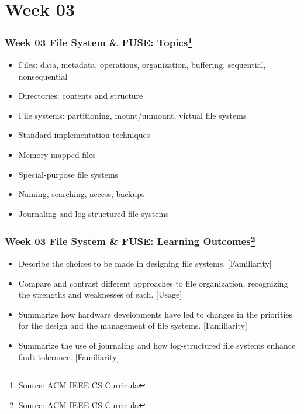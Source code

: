 
\section{Week 03}
\begin{frame}[fragile]
\frametitle{Week 03 File System \& FUSE:
Topics\footnote{Source: ACM IEEE CS Curricula}}

\begin{itemize}
\item Files: data, metadata, operations, organization, buffering, sequential, nonsequential
\item Directories: contents and structure
\item File systems: partitioning, mount/unmount, virtual file systems
\item Standard implementation techniques
\item Memory-mapped files
\item Special-purpose file systems
\item Naming, searching, access, backups
\item Journaling and log-structured file systems
\end{itemize}
\end{frame}

\begin{frame}[fragile]
\frametitle{Week 03 File System \& FUSE:
Learning Outcomes\footnote{Source: ACM IEEE CS Curricula}}
\begin{itemize}
\item Describe the choices to be made in designing file systems. [Familiarity]
\item Compare and contrast different approaches to file organization, recognizing the strengths and weaknesses of each. [Usage]
\item Summarize how hardware developments have led to changes in the priorities for the design and the management of file systems. [Familiarity]
\item Summarize the use of journaling and how log-structured file systems enhance fault tolerance. [Familiarity]
\end{itemize}

\end{frame}


